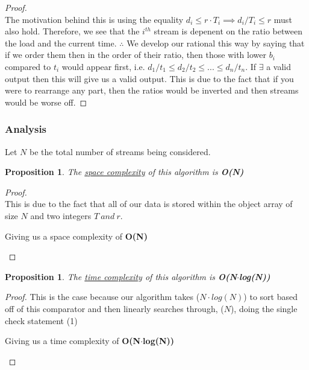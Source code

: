 \documentclass[12pt]{article}
\newtheorem{proposition}[theorem]{Proposition}
\begin{document}
\begin{proof}
~ \\ \indent The motivation behind this is using the equality
$d_i \leq r\cdot T_i \implies d_i/T_i \leq r$ must also hold. Therefore,
we see that the $i^{th}$ stream is depenent on the ratio between the
load and the current time. $\therefore$ We develop our rational this
way by saying that if we order them then in the order of their
ratio, then those with lower $b_i$ compared to $t_i$ would appear
first, i.e. $d_1/t_1 \leq d_2/t_2 \leq ... \leq d_n/t_n$. If $\exists$
a valid output then this will give us a valid output. This is due
to the fact that if you were to rearrange any part, then the ratios
would be inverted and then streams would be worse off.
\end{proof}


\subsubsection{Analysis}
\begin{center}Let $N$ be the total number of streams being considered.\end{center}

\begin{proposition}
\label{numq}
The \underline{space complexity} of this algorithm is \textbf{O(N)}
\end{proposition}

\begin{proof}
~ \\ \indent This is due to the fact that all of our data is stored
within the object array of size $N$ and two integers $T\ and\ r$.
\begin{center}
    Giving us a space complexity of \textbf{O(N)}
\end{center}
\end{proof}

\begin{proposition}
\label{numq}
The \underline{time complexity} of this algorithm is \textbf{O(N$\cdot$log(N))}
\end{proposition}

\begin{proof}
This is the case because our algorithm takes ($N\cdot log(N)$) to sort
based off of this comparator and then linearly searches through, ($N$),
doing the single check statement (1)
\begin{center}
    Giving us a time complexity of \textbf{O(N$\cdot$log(N))}
\end{center}
\end{proof}



\end{document}
